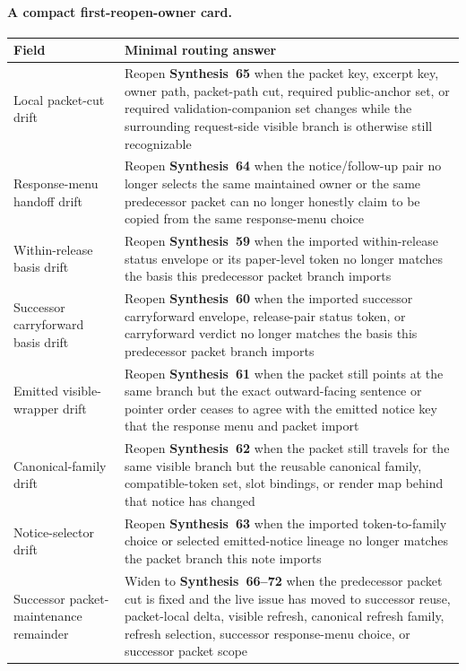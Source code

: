 \documentclass[11pt]{article}
\begin{document}
\paragraph{A compact first-reopen-owner card.}
\begin{table}[t]
\centering
\small
\begin{tabularx}{\linewidth}{@{}Z Y@{}}
\toprule
Field & Minimal routing answer \\
\midrule
Local packet-cut drift & Reopen \textbf{Synthesis~65} when the packet key, excerpt key, owner path, packet-path cut, required public-anchor set, or required validation-companion set changes while the surrounding request-side visible branch is otherwise still recognizable \\
Response-menu handoff drift & Reopen \textbf{Synthesis~64} when the notice/follow-up pair no longer selects the same maintained owner or the same predecessor packet can no longer honestly claim to be copied from the same response-menu choice \\
Within-release basis drift & Reopen \textbf{Synthesis~59} when the imported within-release status envelope or its paper-level token no longer matches the basis this predecessor packet branch imports \\
Successor carryforward basis drift & Reopen \textbf{Synthesis~60} when the imported successor carryforward envelope, release-pair status token, or carryforward verdict no longer matches the basis this predecessor packet branch imports \\
Emitted visible-wrapper drift & Reopen \textbf{Synthesis~61} when the packet still points at the same branch but the exact outward-facing sentence or pointer order ceases to agree with the emitted notice key that the response menu and packet import \\
Canonical-family drift & Reopen \textbf{Synthesis~62} when the packet still travels for the same visible branch but the reusable canonical family, compatible-token set, slot bindings, or render map behind that notice has changed \\
Notice-selector drift & Reopen \textbf{Synthesis~63} when the imported token-to-family choice or selected emitted-notice lineage no longer matches the packet branch this note imports \\
Successor packet-maintenance remainder & Widen to \textbf{Synthesis~66--72} when the predecessor packet cut is fixed and the live issue has moved to successor reuse, packet-local delta, visible refresh, canonical refresh family, refresh selection, successor response-menu choice, or successor packet scope \\

\end{tabularx}
\end{table}
\end{document}
